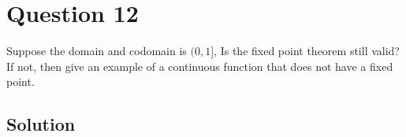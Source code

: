 \section*{Question 12}

Suppose the domain and codomain is \( (0,1] \), Is the fixed point theorem still valid?
If not, then give an example of a continuous function that does not have a fixed point.

\subsection*{Solution}
